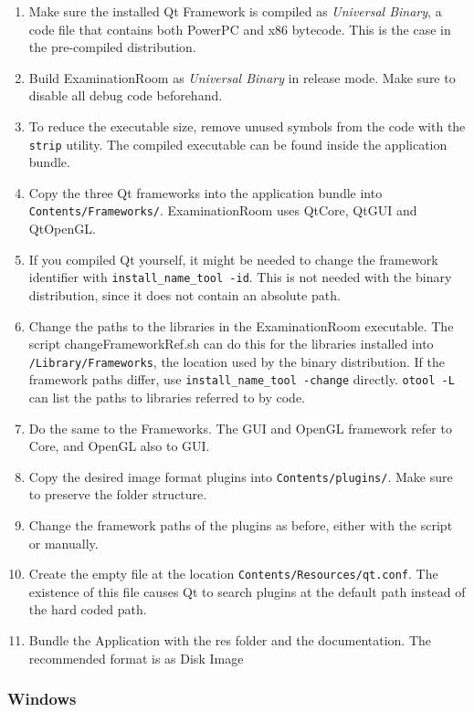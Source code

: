 \begin{enumerate}
\item Make sure the installed Qt Framework is compiled as \textit{Universal Binary}, a code file that contains both PowerPC and x86 bytecode. This is the case in the pre-compiled distribution.
\item Build ExaminationRoom as \textit{Universal Binary} in release mode.
Make sure to disable all debug code beforehand.
\item To reduce the executable size, remove unused symbols from the code with the \texttt{strip} utility.
The compiled executable can be found inside the application bundle.
\item Copy the three Qt frameworks into the application bundle into \texttt{Contents/Frameworks/}.
ExaminationRoom uses QtCore, QtGUI and QtOpenGL.
\item If you compiled Qt yourself, it might be needed to change the framework identifier with \texttt{install\_name\_tool -id}.
This is not needed with the binary distribution, since it does not contain an absolute path.
\item Change the paths to the libraries in the ExaminationRoom executable.
The script changeFrameworkRef.sh can do this for the libraries installed into \texttt{/Library/Frameworks}, the location used by the binary distribution.
If the framework paths differ, use \texttt{install\_name\_tool -change} directly.
\texttt{otool -L} can list the paths to libraries referred to by code.
\item Do the same to the Frameworks. The GUI and OpenGL framework refer to Core, and OpenGL also to GUI.
\item Copy the desired image format plugins into \texttt{Contents/plugins/}.
Make sure to preserve the folder structure.
\item Change the framework paths of the plugins as before, either with the script or manually.
\item Create the empty file at the location \texttt{Contents/Resources/qt.conf}.
The existence of this file causes Qt to search plugins at the default path instead of the hard coded path.
\item Bundle the Application with the res folder and the documentation. The recommended format is as Disk Image
\end{enumerate}

\subsubsection{Windows}
